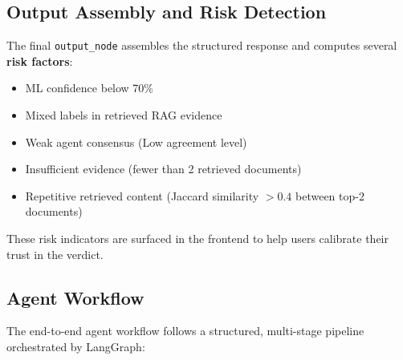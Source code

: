 \documentclass[12pt, a4paper]{article}
\begin{document}
\subsection{Output Assembly and Risk Detection}

The final \texttt{output\_node} assembles the structured response and
computes several \textbf{risk factors}:

\begin{itemize}[leftmargin=2em]
    \item ML confidence below 70\%
    \item Mixed labels in retrieved RAG evidence
    \item Weak agent consensus (Low agreement level)
    \item Insufficient evidence (fewer than 2 retrieved documents)
    \item Repetitive retrieved content (Jaccard similarity $> 0.4$ between
          top-2 documents)
\end{itemize}

These risk indicators are surfaced in the frontend to help users calibrate
their trust in the verdict.


\subsection{Agent Workflow}

The end-to-end agent workflow follows a structured, multi-stage pipeline
orchestrated by LangGraph:
\end{document}
